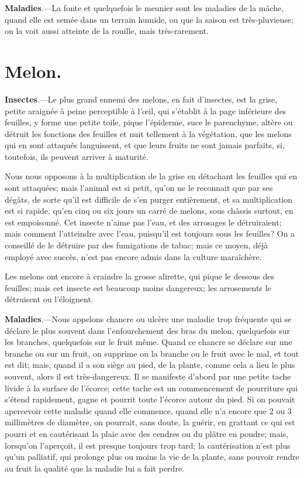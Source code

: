 \documentclass[10pt,a4paper]{book}
\begin{document}
\textbf{Maladies}.---La fonte et quelquefois le meunier sont les maladies de la mâche, quand elle est semée dans un terrain humide, ou que la saison est très-pluvieuse; on la voit aussi atteinte de la rouille, mais très-rarement.

\section{Melon.}

\textbf{Insectes}.---Le plus grand ennemi des melons, en fait d'insectes, est la grise, petite araignée à peine perceptible à l'œil, qui s'établit à la page inférieure des feuilles, y forme une petite toile, pique l'épiderme, suce le parenchyme, altère ou détruit les fonctions des feuilles et nuit tellement à la végétation, que les melons qui en sont attaqués languissent, et que leurs fruits ne sont jamais parfaits, si, toutefois, ils peuvent arriver à maturité.

Nous nous opposons à la multiplication de la grise en détachant les feuilles qui en sont attaquées; mais l'animal est si petit, qu'on ne le reconnait que par ses dégâts, de sorte qu'il est difficile de s'en purger entièrement, et sa multiplication est si rapide, qu'en cinq ou six jours un carré de melons, sous châssis surtout, en est empoisonné. Cet insecte n'aime pas l'eau, et des arrosages le détruiraient; mais comment l'atteindre avec l'eau, puisqu'il est toujours sous les feuilles? On a conseillé de le détruire par des fumigations de tabac; mais ce moyen, déjà employé avec succès, n'est pas encore admis dans la culture maraîchère.

Les melons ont encore à craindre la grosse alirette, qui pique le dessous des feuilles; mais cet insecte est beaucoup moins dangereux; les arrosements le détruisent ou l'éloignent.

\textbf{Maladies}.---Nous appelons chancre ou ulcère une maladie trop fréquente qui se déclare le plus souvent dans l'enfourchement des bras du melon, quelquefois sur les branches, quelquefois sur le fruit même. Quand ce chancre se déclare sur une branche ou sur un fruit, on supprime ou la branche ou le fruit avec le mal, et tout est dit; mais, quand il a son siège au pied, de la plante, comme cela a lieu le plus souvent, alors il est très-dangereux. Il se manifeste d'abord par une petite tache livide à la surface de l'écorce; cette tache est un commencement de pourriture qui s'étend rapidement, gagne et pourrit toute l'écorce autour du pied. Si on pouvait apercevoir cette maladie quand elle commence, quand elle n'a encore que 2 ou 3 millimètres de diamètre, on pourrait, sans doute, la guérir, en grattant ce qui est pourri et en cautérisant la plaie avec des cendres ou du plâtre en poudre; mais, lorsqu'on l'aperçoit, il est presque toujours trop tard; la cautérisation n'est plus qu'un palliatif, qui prolonge plus ou moins la vie de la plante, sans pouvoir rendre au fruit la qualité que la maladie lui a fait perdre.
\end{document}
